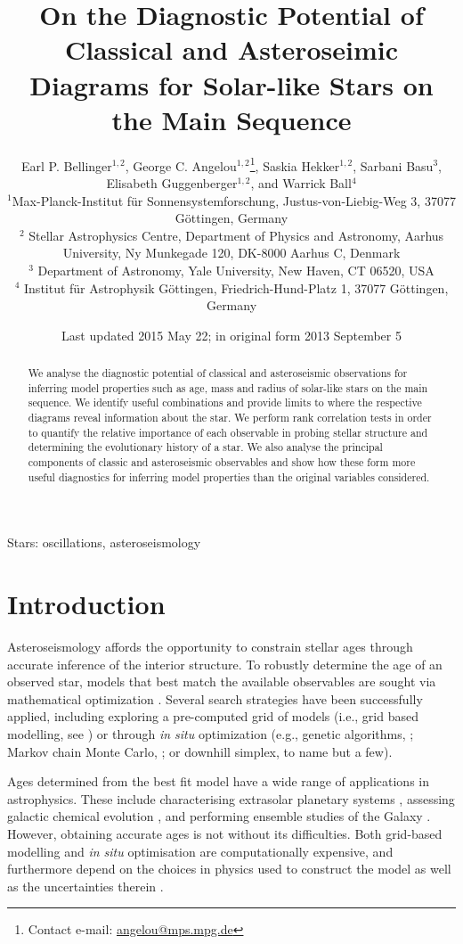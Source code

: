 \documentclass[a4paper,fleqn,usenatbib,useAMS]{mnras}
\title[Asteroseimic Diagrams]{On the Diagnostic Potential of Classical and Asteroseimic Diagrams for Solar-like Stars on the Main Sequence}
\author[E. P. Bellinger, et al.] {Earl P. Bellinger$^{1,2}$, George C. Angelou$^{1,2}$\thanks{Contact e-mail: \href{mailto:angelou@mps.mpg.de}{angelou@mps.mpg.de}}, Saskia Hekker$^{1,2}$, Sarbani Basu$^{3}$, 
\newauthor Elisabeth Guggenberger$^{1,2}$, and Warrick Ball$^{4}$ 
\\
$^{1}$Max-Planck-Institut f\"{u}r Sonnensystemforschung, Justus-von-Liebig-Weg 3, 37077 G\"{o}ttingen, Germany\\
$^{2}$ Stellar Astrophysics Centre, Department of Physics and Astronomy, Aarhus University, Ny Munkegade 120, DK-8000 Aarhus C, Denmark \\
$^{3}$ Department of Astronomy, Yale University, New Haven, CT 06520, USA \\
$^{4}$ Institut f\"ur Astrophysik G\"ottingen, Friedrich-Hund-Platz 1, 37077 G\"ottingen, Germany }
\date{Last updated 2015 May 22; in original form 2013 September 5}
\begin{document}
\label{firstpage}
\pagerange{\pageref{firstpage}--\pageref{lastpage}}
\maketitle

\begin{abstract}
We analyse the diagnostic potential of classical and asteroseismic observations for inferring model properties such as age, mass and radius of solar-like stars on the main sequence. We identify useful combinations and provide limits to where the respective diagrams reveal information about the star. We perform rank correlation tests in order to quantify the relative importance of each observable in probing stellar structure and determining the evolutionary history of a star. We also analyse the principal components of classic and asteroseismic observables and show how these form more useful diagnostics for inferring model properties than the original variables considered. 
\end{abstract}

\begin{keywords}
Stars: oscillations,  asteroseismology
\end{keywords}



\section{Introduction}

Asteroseismology affords the opportunity to constrain stellar ages through accurate inference of the interior structure. To robustly determine the age of an observed star, models that best match the available observables are sought via mathematical optimization \citep{1994ApJ...427.1013B}. Several search strategies have been successfully applied, including exploring a pre-computed grid of models (i.e., grid based modelling, see \citealt{2011ApJ...730...63G, 2014ApJS..210....1C}) or through \emph{in situ} optimization (e.g., genetic algorithms, \citealt{2014ApJS..214...27M}; Markov chain Monte Carlo, \citealt{2012MNRAS.427.1847B}; or downhill simplex, \citealt{2013ApJS..208....4P} to name but a few). 

Ages determined from the best fit model have a wide range of applications in astrophysics. These include characterising extrasolar planetary systems \citep{2015ApJ...799..170C,2015MNRAS.452.2127S}, assessing galactic chemical evolution , and performing ensemble studies of the Galaxy \citep{2011Sci...332..213C, 2013MNRAS.429..423M, 2014ApJS..210....1C}. However, obtaining accurate ages is not without its difficulties. Both grid-based modelling and \emph{in situ} optimisation are computationally expensive, and furthermore depend on the choices in physics used to construct the model as well as the uncertainties therein \citep{2014A&A...569A..21L}. 
\end{document}
